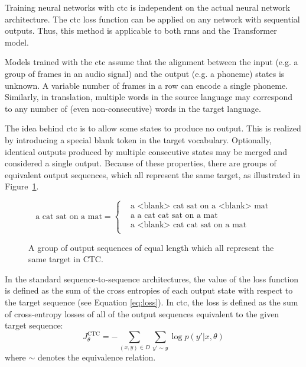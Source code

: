 Training neural networks with \ac{ctc} is independent on the actual neural
network architecture. The \ac{ctc} loss function can be applied on any network
with sequential outputs. Thus, this method is applicable to both \acp{rnn} and
the Transformer model.

Models trained with the \ac{ctc} assume that the alignment between the input
(e.g. a group of frames in an audio signal) and the output (e.g. a phoneme)
states is unknown. A variable number of frames in a row can encode a single
phoneme. Similarly, in translation, multiple words in the source language may
correspond to any number of (even non-consecutive) words in the target
language.

The idea behind \ac{ctc} is to allow some states to produce no output. This is
realized by introducing a special blank token in the target vocabulary.
Optionally, identical outputs produced by multiple consecutive states may be
merged and considered a single output. Because of these properties, there are
groups of equivalent output sequences, which all represent the same target, as
illustrated in Figure~\ref{fig:ctc-equivalent-sequences}.

\begin{figure}
  \centering
  \begin{minipage}{\textwidth}
    \begin{equation*}
        \text{a cat sat on a mat} =
        \begin{cases}
          & \text{a <blank> cat sat on a <blank> mat} \\
          & \text{a a cat cat sat on a mat} \\
          & \text{a <blank> cat cat sat on a mat} \\
        \end{cases}
    \end{equation*}
  \end{minipage}
  \caption{A group of output sequences of equal length which all represent the
    same target in CTC.} %
  \label{fig:ctc-equivalent-sequences}
\end{figure}

In the standard sequence-to-sequence architectures, the value of the loss
function is defined as the sum of the cross entropies of each output state with
respect to the target sequence (see Equation \ref{eq:loss}). In \ac{ctc}, the
loss is defined as the sum of cross-entropy losses of all of the output
sequences equivalent to the given target sequence:
%
\begin{equation}
  J_{\theta}^{\text{CTC}} = - \sum_{(x, y) \in D} \sum_{y' \sim y}  \log p(y' | x, \theta)
  \label{eq:ctc-loss}
\end{equation}
%
where $\sim$ denotes the equivalence relation.  

